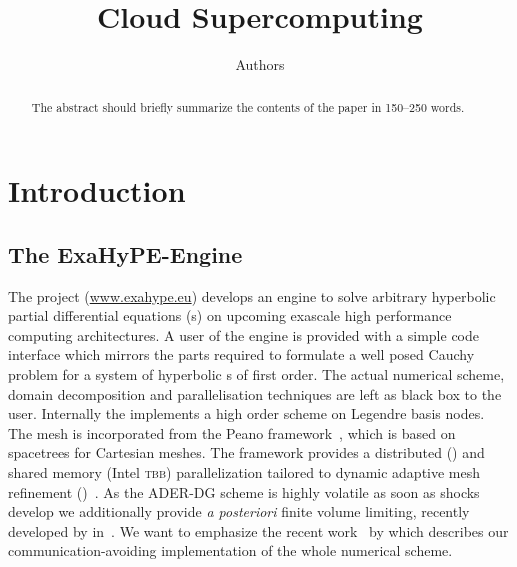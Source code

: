 \documentclass[runningheads]{llncs}
\title{Cloud Supercomputing}
\author{Authors}
\institute{Institute}
\begin{document}
\maketitle
\begin{abstract}
The abstract should briefly summarize the contents of the paper in
150--250 words.

\end{abstract}
\section{Introduction}
\subsection{The ExaHyPE-Engine}
The \exahype{} project (\url{www.exahype.eu}) develops an engine to solve arbitrary hyperbolic partial differential equations (\pde{}s) on upcoming exascale high performance computing architectures.
A user of the engine is provided with a simple code interface which mirrors the parts required to formulate a well posed Cauchy problem for a system of hyperbolic \pde{}s of first order.
The actual numerical scheme, domain decomposition and parallelisation techniques are left as black box to the user.
Internally the \exahypeengine{} implements a high order \aderdg{} scheme on Legendre basis nodes.
The mesh is incorporated from the Peano framework~\cite{weinzierl2011}, which is based on spacetrees for Cartesian meshes.
The framework provides a distributed (\mpi{}) and shared memory (Intel \textsc{tbb}) parallelization tailored to dynamic adaptive mesh refinement (\amr{})~.
As the ADER-DG scheme is highly volatile as soon as shocks develop we additionally provide \textit{a posteriori} finite volume limiting, recently developed by \citeauthor{dumbser2016simple} in~\cite{dumbser2016simple}.
We want to emphasize the recent work~\cite{charrier2018stop} by \citeauthor{charrier2018stop} which describes our communication-avoiding implementation of the whole numerical scheme.
\newcommand{\diffCoeff}{\varepsilon}%
\newcommand{\hyperFluxDef}{
  \begin{pmatrix}
    \Qj \\
    \Qv  \otimes \Qj + \bm{I} \pressure  \\
    \Qv \cdot (\bm{I} \QE + \bm{I} \pressure)
  \end{pmatrix}
}%
\newcommand{\viscFluxDef}{
  \begin{pmatrix}
    0\\
     \stressT (\Q, \gradQ)  \\
     \Qv \cdot \stressT (\Q, \gradQ) - \kappa \gradient{T}
   \end{pmatrix}
}%
\end{document}
